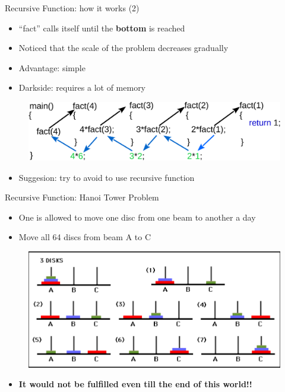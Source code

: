 \begin{frame}[fragile]{Recursive Function: how it works (2)}
\vspace{0.1in}
\begin{itemize}
	\item {``fact'' calls itself until the \textbf{bottom} is reached}
	\item {Noticed that the scale of the problem decreases gradually}
	\item {Advantage: simple}
	\item {Darkside: requires a lot of memory}
\end{itemize}
\vspace{0.2in}
\begin{figure}
	\includegraphics[width=0.95\linewidth]{figs/recurs.pdf}
\end{figure}
\begin{itemize}
	\item {Suggesion: try to avoid to use recursive function}
\end{itemize}
\end{frame}

\begin{frame}{Recursive Function: Hanoi Tower Problem}
\begin{itemize}
	\item {One is allowed to move one disc from one beam to another a day}
	\item {Move all 64 discs from beam A to C}
\end{itemize}
\begin{figure}
	\includegraphics[width=0.85\linewidth]{figs/hanoi.pdf}
\end{figure}
\begin{itemize}
	\item {\textbf{It would not be fulfilled even till the end of this world!!}}
\end{itemize}
\end{frame}

